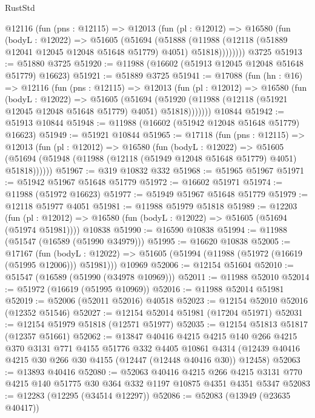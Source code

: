 \begin{lexlean}{RustStd}
\begin{coremodule}
      @12116
        (fun (pns : @12115) =>
        @12013
          (fun (pl : @12012) =>
          @16580
            (fun (bodyL : @12022) =>
            @51605
              (@51694
                (@51888
                  (@11988 (@12118 (@51889 @12041 @12045 @12048 @51648 @51779) @4051) @51818))))))))
    @3725
@51913 := @51880 @3725
@51920 := @11988 (@16602 (@51913 @12045 @12048 @51648 @51779) @16623)
@51921 := @51889 @3725
@51941 := @17088
    (fun (hn : @16) =>
    @12116
      (fun (pns : @12115) =>
      @12013
        (fun (pl : @12012) =>
        @16580
          (fun (bodyL : @12022) =>
          @51605
            (@51694
              (@51920 (@11988 (@12118 (@51921 @12045 @12048 @51648 @51779) @4051) @51818)))))))
    @10844
@51942 := @51913 @10844
@51948 := @11988 (@16602 (@51942 @12048 @51648 @51779) @16623)
@51949 := @51921 @10844
@51965 := @17118
    (fun (pns : @12115) =>
    @12013
      (fun (pl : @12012) =>
      @16580
        (fun (bodyL : @12022) =>
        @51605 (@51694 (@51948 (@11988 (@12118 (@51949 @12048 @51648 @51779) @4051) @51818))))))
@51967 := @319 @10832 @332
@51968 := @51965 @51967
@51971 := @51942 @51967 @51648 @51779
@51972 := @16602 @51971
@51974 := @11988 (@51972 @16623)
@51977 := @51949 @51967 @51648 @51779
@51979 := @12118 @51977 @4051
@51981 := @11988 @51979 @51818
@51989 := @12203
    (fun (pl : @12012) => @16580 (fun (bodyL : @12022) => @51605 (@51694 (@51974 @51981))))
    @10838
@51990 := @16590 @10838
@51994 := @11988 (@51547 (@16589 (@51990 @34979)))
@51995 := @16620 @10838
@52005 := @17167
    (fun (bodyL : @12022) => @51605 (@51994 (@11988 (@51972 (@16619 (@51995 @12006))) @51981)))
    @10969
@52006 := @12154 @51604
@52010 := @51547 (@16589 (@51990 (@34978 @10969)))
@52011 := @11988 @52010
@52014 := @51972 (@16619 (@51995 @10969))
@52016 := @11988 @52014 @51981
@52019 := @52006 (@52011 @52016) @40518
@52023 := @12154 @52010 @52016 (@12352 @51546)
@52027 := @12154 @52014 @51981 (@17204 @51971)
@52031 := @12154 @51979 @51818 (@12571 @51977)
@52035 := @12154 @51813 @51817 (@12357 @51661)
@52062 := @13847
    @40416
    @4215
    @4215
    @140
    @266
    @4215
    @370
    @3131
    @771
    @4155
    @51776
    @332
    @4405
    @10861
    @4314
    (@12439 @40416 @4215 @30 @266 @30 @4155 (@12447 (@12448 @40416 @30)) @12458)
@52063 := @13893 @40416
@52080 := @52063
    @40416
    @4215
    @266
    @4215
    @3131
    @770
    @4215
    @140
    @51775
    @30
    @364
    @332
    @1197
    @10875
    @4351
    @4351
    @5347
@52083 := @12283 (@12295 (@34514 @12297))
@52086 := @52083 (@13949 (@23635 @40417))

\end{coremodule}
\end{lexlean}
